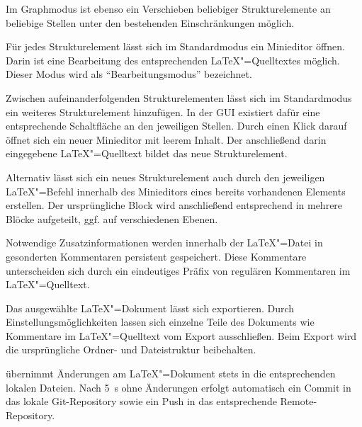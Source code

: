 Im Graphmodus ist ebenso ein Verschieben beliebiger Strukturelemente an beliebige Stellen unter den bestehenden
Einschränkungen möglich.


Für jedes Strukturelement lässt sich im Standardmodus ein Minieditor öffnen.
Darin ist eine Bearbeitung des entsprechenden \LaTeX"=Quelltextes möglich.
Dieser Modus wird als \enquote{Bearbeitungsmodus} bezeichnet.

\clearpage


Zwischen aufeinanderfolgenden Strukturelementen lässt sich im Standardmodus ein weiteres Strukturelement hinzufügen.
In der GUI existiert dafür eine entsprechende Schaltfläche an den jeweiligen Stellen.
Durch einen Klick darauf öffnet sich ein neuer Minieditor mit leerem Inhalt.
Der anschließend darin eingegebene \LaTeX"=Quelltext bildet das neue Strukturelement.

Alternativ lässt sich ein neues Strukturelement auch durch den jeweiligen \LaTeX"=Befehl innerhalb des Minieditors
eines bereits vorhandenen Elements erstellen.
Der ursprüngliche Block wird anschließend entsprechend in mehrere Blöcke aufgeteilt, ggf. auf verschiedenen Ebenen.


Notwendige Zusatzinformationen werden innerhalb der \LaTeX"=Datei in gesonderten Kommentaren persistent gespeichert.
Diese Kommentare unterscheiden sich durch ein eindeutiges Präfix von regulären Kommentaren im \LaTeX"=Quelltext.


Das ausgewählte \LaTeX"=Dokument lässt sich exportieren.
Durch Einstellungsmöglichkeiten lassen sich einzelne Teile des Dokuments wie Kommentare im \LaTeX"=Quelltext vom Export
ausschließen.
Beim Export wird die ursprüngliche Ordner- und Dateistruktur beibehalten.


\texla{} übernimmt Änderungen am \LaTeX"=Dokument stets in die entsprechenden lokalen Dateien.
Nach 5~\si{\second} ohne Änderungen erfolgt automatisch ein Commit in das lokale Git-Repository sowie ein Push in das
entsprechende Remote-Repository.

